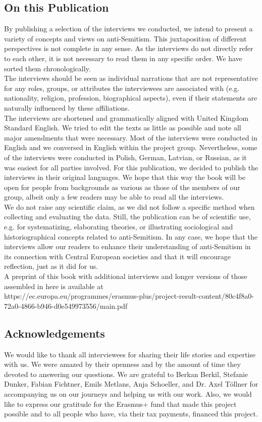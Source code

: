 \subsection*{On this Publication}
By publishing a selection of the interviews we conducted, we intend to present a variety of concepts and views on anti-Semitism. This juxtaposition of different perspectives is not complete in any sense. As the interviews do not directly refer to each other, it is not necessary to read them in any specific order. We have sorted them chronologically. \\ 
The interviews should be seen as individual narrations that are not representative for any roles, groups, or attributes the interviewees are associated with (e.g. nationality, religion, profession, biographical aspects), even if their statements are naturally influenced by these affiliations. \\
The interviews are shortened and grammatically aligned with United Kingdom Standard English. We tried to edit the texts as little as possible and note all major amendments that were necessary. Most of the interviews were conducted in English and we conversed in English within the project group. Nevertheless, some of the interviews were conducted in Polish, German, Latvian, or Russian, as it was easiest for all parties involved. For this publication, we decided to publish the interviews in their original languages. We hope that this way the book will be open for people from backgrounds as various as those of the members of our group, albeit only a few readers may be able to read all the interviews.\\
We do not raise any scientific claim, as we did not follow a specific method when collecting and evaluating the data. Still, the publication can be of scientific use, e.g. for systematizing, elaborating theories, or illustrating sociological and historiographical concepts related to anti-Semitism. In any case, we hope that the interviews allow our readers to enhance their understanding of anti-Semitism in its connection with Central European societies and that it will encourage reflection, just as it did for us. \\
A preprint of this book with additional interviews and longer versions of those assembled in here is available at\\ https://ec.europa.eu/programmes/erasmus-plus/project-result-content/80c4f8a0-72a0-4866-b946-d0e549973556/main.pdf  
\subsection*{Acknowledgements}
We would like to thank all interviewees for sharing their life stories and expertise with us. We were amazed by their openness and by the amount of time they devoted to answering our questions. We are grateful to Berkan Berkil, Stefanie Dunker, Fabian Fichtner, Emils Metlans, Anja Schoeller, and Dr. Axel Töllner for accompanying us on our journeys and helping us with our work. Also, we would like to express our gratitude for the Erasmus+ fund that made this project possible and to all people who have, via their tax payments, financed this project. 
